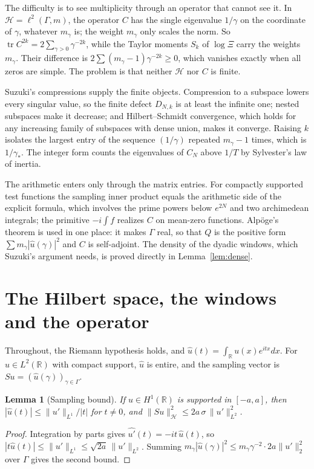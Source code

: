 \documentclass[11pt,a4paper]{article}
\theoremstyle{plain}
\newtheorem{lemma}[theorem]{Lemma}
\theoremstyle{remark}
\DeclareMathOperator{\tr}{tr}
\newcommand{\R}{\mathbb R}
\newcommand{\Hs}{\mathcal H}
\begin{document}
The difficulty is to see multiplicity through an operator that cannot see it. In $\Hs=\ell^2(\Gamma,m)$, the operator
$C$ has the single eigenvalue $1/\gamma$ on the coordinate of $\gamma$, whatever $m_\gamma$ is; the weight $m_\gamma$
only scales the norm. So $\tr C^{2k}=2\sum_{\gamma>0}\gamma^{-2k}$, while the Taylor moments $S_k$ of $\log\Xi$
carry the weights $m_\gamma$. Their difference is $2\sum(m_\gamma-1)\gamma^{-2k}\ge0$, which vanishes exactly when
all zeros are simple. The problem is that neither $\Hs$ nor $C$ is finite.

Suzuki's compressions supply the finite objects. Compression to a subspace lowers every singular value, so the finite
defect $D_{N,k}$ is at least the infinite one; nested subspaces make it decrease; and Hilbert--Schmidt convergence,
which holds for any increasing family of subspaces with dense union, makes it converge. Raising $k$ isolates the
largest entry of the sequence $(1/\gamma)$ repeated $m_\gamma-1$ times, which is $1/\gamma_*$. The integer form
counts the eigenvalues of $C_N$ above $1/T$ by Sylvester's law of inertia.

The arithmetic enters only through the matrix entries. For compactly supported test functions the sampling inner
product equals the arithmetic side of the explicit formula, which involves the prime powers below $e^{2N}$ and two
archimedean integrals; the primitive $-i\int f$ realizes $C$ on mean-zero functions. Alp\"oge's theorem is used in one
place: it makes $\Gamma$ real, so that $Q$ is the positive form $\sum m_\gamma|\widehat u(\gamma)|^2$ and $C$ is
self-adjoint. The density of the dyadic windows, which Suzuki's argument needs, is proved directly in
Lemma~\ref{lem:dense}.

\section{The Hilbert space, the windows and the operator}\label{sec:space}

Throughout, the Riemann hypothesis holds, and $\widehat u(t)=\int_\R u(x)e^{itx}dx$. For $u\in L^2(\R)$ with compact
support, $\widehat u$ is entire, and the sampling vector is $Su=(\widehat u(\gamma))_{\gamma\in\Gamma}$.

\begin{lemma}[Sampling bound]\label{lem:sample}
If $u\in H^1(\R)$ is supported in $[-a,a]$, then $|\widehat u(t)|\le\|u'\|_{L^1}/|t|$ for $t\ne0$, and
$\|Su\|_\Hs^2\le 2a\,\sigma\,\|u'\|_{L^2}^2$.
\end{lemma}
\begin{proof}
Integration by parts gives $\widehat{u'}(t)=-it\,\widehat u(t)$, so $|t\widehat u(t)|\le\|u'\|_{L^1}\le
\sqrt{2a}\,\|u'\|_{L^2}$. Summing $m_\gamma|\widehat u(\gamma)|^2\le m_\gamma\gamma^{-2}\cdot2a\|u'\|_2^2$ over
$\Gamma$ gives the second bound.
\end{proof}
\end{document}
